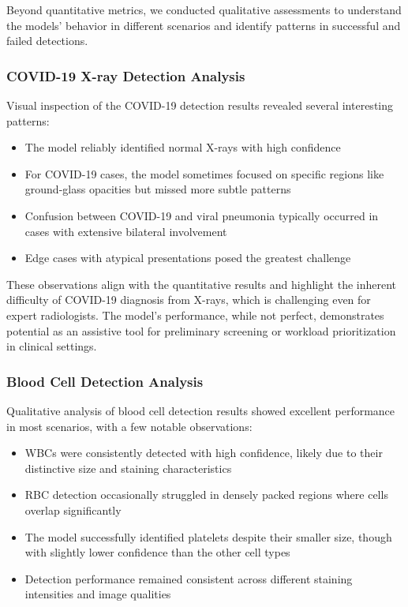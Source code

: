 \begin{multicols}{2}
Beyond quantitative metrics, we conducted qualitative assessments to understand the models' behavior in different scenarios and identify patterns in successful and failed detections.

\subsubsection{COVID-19 X-ray Detection Analysis}

Visual inspection of the COVID-19 detection results revealed several interesting patterns:

\begin{itemize}
    \item The model reliably identified normal X-rays with high confidence
    \item For COVID-19 cases, the model sometimes focused on specific regions like ground-glass opacities but missed more subtle patterns
    \item Confusion between COVID-19 and viral pneumonia typically occurred in cases with extensive bilateral involvement
    \item Edge cases with atypical presentations posed the greatest challenge
\end{itemize}

These observations align with the quantitative results and highlight the inherent difficulty of COVID-19 diagnosis from X-rays, which is challenging even for expert radiologists. The model's performance, while not perfect, demonstrates potential as an assistive tool for preliminary screening or workload prioritization in clinical settings.

\subsubsection{Blood Cell Detection Analysis}

Qualitative analysis of blood cell detection results showed excellent performance in most scenarios, with a few notable observations:

\begin{itemize}
    \item WBCs were consistently detected with high confidence, likely due to their distinctive size and staining characteristics
    \item RBC detection occasionally struggled in densely packed regions where cells overlap significantly
    \item The model successfully identified platelets despite their smaller size, though with slightly lower confidence than the other cell types
    \item Detection performance remained consistent across different staining intensities and image qualities
\end{itemize}


\end{multicols}
